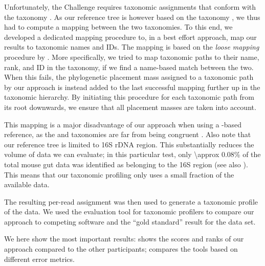 Unfortunately, the  Challenge requires taxonomic assignments
that conform with the  taxonomy \citep{Sayers2009,Benson2009}.
As our reference tree is however based on the  taxonomy \citep{Yilmaz2014},
we thus had to compute a mapping between the two taxonomies. %
To this end, we developed a dedicated mapping procedure to, in a best effort approach,
map our results to  taxonomic names and IDs.
The mapping is based on the \textit{loose mapping} procedure by \cite{Balvociute2017}.
More specifically, we tried to map taxonomic paths to their name, rank, and ID in the  taxonomy,
if we find a name-based match between the two.
When this fails, the phylogenetic placement mass assigned to a taxonomic path by our approach
is instead added to the last successful mapping further up in the taxonomic hierarchy.
By initiating this procedure for each taxonomic path from its root downwards,
we ensure that all placement masses are taken into account.

This mapping is a major disadvantage of our approach when using a -based reference,
as the  and  taxonomies are far from being congruent \citep{Balvociute2017}.
Also note that our reference tree is limited to 16S rDNA region.
This substantially reduces the volume of data we can evaluate;
in this particular test, only \num{\approx 0.08}\% of the total mouse gut data was identified as belonging to the 16S region
(see also ).
This means that our taxonomic profiling only uses a small fraction of the available data.

The resulting per-read assignment was then used to generate a taxonomic profile of the data.
We used the  evaluation tool for taxonomic profilers  \citep{Sczyrba2017}
to compare our approach to competing software and the ``gold standard'' result for the data set.

We here show the most important  results:
 shows the scores and ranks of our approach compared to the other  participants;
 compares the tools based on different error metrics.%

